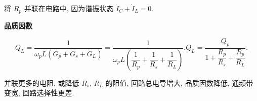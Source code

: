 将 $R_p$ 并联在电路中, 因为谐振状态 $\dot{I}_C+\dot{I}_L=0$.

\textbf{品质因数}

\begin{subequations}
    \begin{equation}
        Q_L=\frac{1}{\omega_pL(G_p+G_s+G_L)}=\frac{1}{\omega_pL\left(\dfrac{1}{R_p}+\dfrac{1}{R_s}+\dfrac{1}{R_L}\right)}.
    \end{equation}
    \begin{equation}
        Q_L=\frac{Q_p}{1+\dfrac{R_p}{R_s}+\dfrac{R_p}{R_L}}.
    \end{equation}
\end{subequations}

并联更多的电阻, 或降低 $R_s$, $R_L$ 的阻值, 回路总电导增大, 品质因数降低, 通频带变宽, 回路选择性更差.

